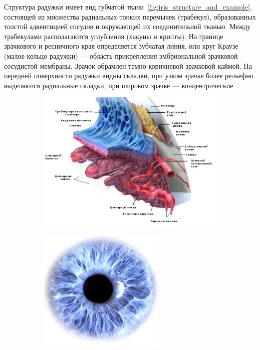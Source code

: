 Структура радужки имеет вид губчатой ткани~\ref{fig:iris_structure_and_example}, состоящей из множества радиальных тонких перемычек (трабекул), образованных толстой адвентицией сосудов и окружающей их соединительной тканью. Между трабекулами располагаются углубления (лакуны и крипты). На границе зрачкового и ресничного края определяется зубчатая линия, или круг Краузе (малое кольцо радужки) — область прикрепления эмбриональной зрачковой сосудистой мембраны. Зрачок обрамлен темно-коричневой зрачковой каймой. На передней поверхности радужки видны складки, при узком зрачке более рельефно выделяются радиальные складки, при широком зрачке — концентрические~\cite{krasnov_1952}.

\begin{figure}[!h]
	\begin{subfigure}{.65\textwidth}
		\centering
		\includegraphics[width=0.95\columnwidth]{pictures/iris-trabelular-structure.jpg}
		\label{fig:iris_trabecular_structure}
	\end{subfigure}%
	\begin{subfigure}{.35\textwidth}
		\centering
		\includegraphics[width=0.95\columnwidth]{pictures/blue-iris-bagel.jpeg}

\end{subfigure}
\end{figure}
